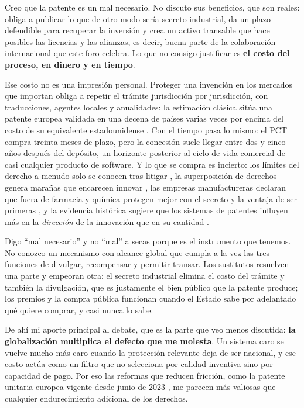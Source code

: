 \documentclass[11pt,letterpaper]{article}
\begin{document}
Creo que la patente es un mal necesario. No discuto sus beneficios, que son
reales: obliga a publicar lo que de otro modo sería secreto industrial, da un
plazo defendible para recuperar la inversión y crea un activo transable que hace
posibles las licencias y las alianzas, es decir, buena parte de la colaboración
internacional que este foro celebra. Lo que no consigo justificar es \textbf{el
costo del proceso, en dinero y en tiempo}.

Ese costo no es una impresión personal. Proteger una invención en los mercados
que importan obliga a repetir el trámite jurisdicción por jurisdicción, con
traducciones, agentes locales y anualidades: la estimación clásica sitúa una
patente europea validada en una decena de países varias veces por encima del
costo de su equivalente estadounidense \parencite{vanpottelsberghe2009}. Con el
tiempo pasa lo mismo: el PCT compra treinta meses de plazo, pero la concesión
suele llegar entre dos y cinco años después del depósito, un horizonte posterior
al ciclo de vida comercial de casi cualquier producto de software. Y lo que se
compra es incierto: los límites del derecho a menudo solo se conocen tras
litigar \parencite{bessen2008,jaffe2004}, la superposición de derechos genera
marañas que encarecen innovar \parencite{shapiro2001,heller1998}, las empresas
manufactureras declaran que fuera de farmacia y química protegen mejor con el
secreto y la ventaja de ser primeras \parencite{cohen2000}, y la evidencia
histórica sugiere que los sistemas de patentes influyen más en la
\emph{dirección} de la innovación que en su cantidad \parencite{moser2013}.

Digo \enquote{mal necesario} y no \enquote{mal} a secas porque es el instrumento
que tenemos. No conozco un mecanismo con alcance global que cumpla a la vez las
tres funciones de divulgar, recompensar y permitir transar. Los sustitutos
resuelven una parte y empeoran otra: el secreto industrial elimina el costo del
trámite y también la divulgación, que es justamente el bien público que la
patente produce; los premios y la compra pública funcionan cuando el Estado sabe
por adelantado qué quiere comprar, y casi nunca lo sabe.

De ahí mi aporte principal al debate, que es la parte que veo menos discutida:
\textbf{la globalización multiplica el defecto que me molesta}. Un sistema caro
se vuelve mucho más caro cuando la protección relevante deja de ser nacional, y
ese costo actúa como un filtro que no selecciona por calidad inventiva sino por
capacidad de pago. Por eso las reformas que reducen fricción, como la patente
unitaria europea vigente desde junio de 2023 \parencite{epo2023}, me parecen más
valiosas que cualquier endurecimiento adicional de los derechos.
\end{document}
